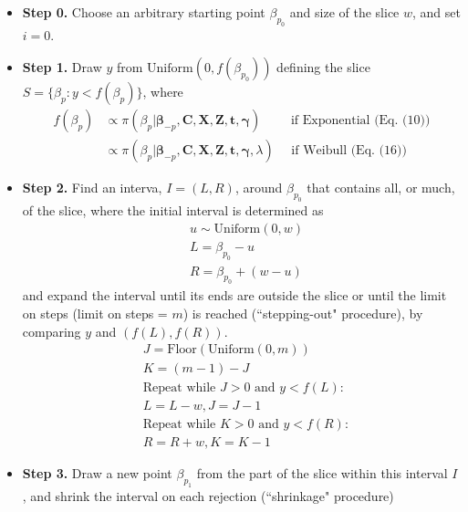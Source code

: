 \documentclass[a4paper, 12pt]{article}
\begin{document}
\begin{itemize}
	\item[] {\textbf{Step 0.}} Choose an arbitrary starting point $\beta_{p_0}$ and size of the slice $w$, and set $i = 0$.
	\item[] {\textbf{Step 1.}} Draw $y$ from $\mbox{Uniform}(0, f(\beta_{p_0}))$ defining the slice $S = \{\beta_p: y < f(\beta_{p})\}$, where
	\begin{equation*}
\begin{aligned}
f(\beta_{p}) &\propto \pi(\beta_{p}|\mathbf{\beta}_{-p}, \mathbf{C}, \mathbf{X}, \mathbf{Z}, \mathbf{t}, \mathbf{\gamma}) \quad \quad\mbox{  if Exponential (Eq. (10))}\\
& \propto \pi(\beta_{p}|\mathbf{\beta}_{-p}, \mathbf{C}, \mathbf{X}, \mathbf{Z}, \mathbf{t}, \mathbf{\gamma}, \lambda)  \quad\mbox{ if Weibull (Eq. (16))}
\end{aligned}
	\end{equation*}
\item[] {\textbf{Step 2.}} Find an interva, $I = (L, R)$, around $\beta_{p_0}$ that contains all, or much, of the slice, where the initial interval is determined as
	\begin{equation*}
	\begin{aligned}
	&u \sim \mbox{Uniform}(0, w)\\
&L = \beta_{p_0} - u\\
& R =  \beta_{p_0} + (w - u)
	\end{aligned}
	\end{equation*}
	and expand the interval until its ends are outside the slice or until the limit on steps (limit on steps = $m$) is reached (``stepping-out" procedure), by comparing $y$ and $(f(L), f(R))$. 
		\begin{equation*}
		\begin{aligned}
		& J =  \mbox{Floor}(\mbox{Uniform}(0,m)) \\&
		K = (m-1) - J \\
	    & \mbox{Repeat while } J > 0 \mbox{ and } y<f(L): \\&L= L - w, J = J -1\\
	    & \mbox{Repeat while } K> 0 \mbox{ and } y<f(R): \\&R= R + w, K = K - 1
			\end{aligned}
			\end{equation*}
\item[] {\textbf{Step 3.}} Draw a new point $\beta_{p_1}$ from the part of the slice within this interval $I$, and shrink the interval on each rejection (``shrinkage" procedure)

\end{itemize}
\end{document}
